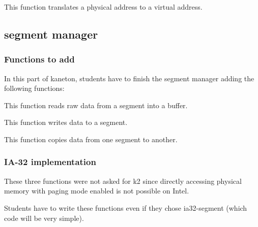 	  {This function translates a physical address to a virtual address.}

\subsection{segment manager}

\subsubsection{Functions to add}

In this part  of kaneton, students have to  finish the segment manager
adding the following functions:

	  {This function reads raw data from a segment into a buffer.}

	  {This function writes data to a segment.}

	  {This function copies data from one segment to another.}

\subsubsection{IA-32 implementation}

These three functions  were not asked for k2  since directly accessing
physical memory with paging mode enabled is not possible on Intel.

Students have to write these functions even if they chose ia32-segment
(which code will be very simple).

